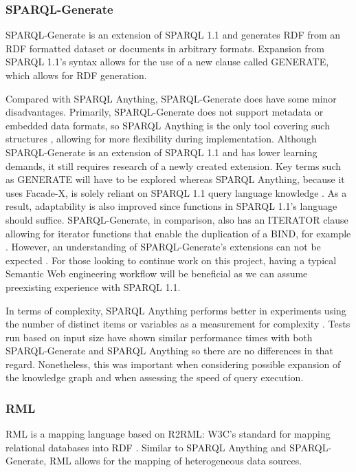 \subsubsection{SPARQL-Generate}
\hspace{0.5cm} SPARQL-Generate is an extension of SPARQL 1.1 and generates RDF from an RDF formatted dataset or documents in arbitrary formats. Expansion from SPARQL 1.1's syntax allows for the use of a new clause called GENERATE, which allows for RDF generation. \cite{lefranccois2017sparql}

Compared with SPARQL Anything, SPARQL-Generate does have some minor disadvantages. Primarily, SPARQL-Generate does not support metadata or embedded data formats, so SPARQL Anything is the only tool covering such structures \cite{sparqlanything}, allowing for more flexibility during implementation. Although SPARQL-Generate is an extension of SPARQL 1.1 and has lower learning demands, it still requires research of a newly created extension. Key terms such as GENERATE will have to be explored whereas SPARQL Anything, because it uses Facade-X, is solely reliant on SPARQL 1.1 query language knowledge \cite{sparqlanything}. As a result, adaptability is also improved since functions in SPARQL 1.1's language should suffice. SPARQL-Generate, in comparison, also has an ITERATOR clause allowing for iterator functions that enable the duplication of a BIND, for example \cite{lefranccois2017sparql}. However, an understanding of SPARQL-Generate's extensions can not be expected \cite{sparqlanything}. For those looking to continue work on this project, having a typical Semantic Web engineering workflow will be beneficial as we can assume preexisting experience with SPARQL 1.1. 

In terms of complexity, SPARQL Anything performs better in experiments using the number of distinct items or variables as a measurement for complexity \cite{sparqlanything}. Tests run based on input size have shown similar performance times with both SPARQL-Generate and SPARQL Anything so there are no differences in that regard. Nonetheless, this was important when considering possible expansion of the knowledge graph and when assessing the speed of query execution. 

\subsubsection{RML}
\hspace{0.5cm} RML is a mapping language based on R2RML: W3C's standard for mapping relational databases into RDF \cite{dimou2014rml}. Similar to SPARQL Anything and SPARQL-Generate, RML allows for the mapping of heterogeneous data sources. 

